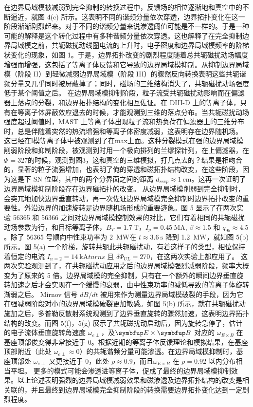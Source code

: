 在边界局域模被减弱到完全抑制的转换过程中，反馈场的相位逐渐地和真空中的不断逼近，就图 4(c) 所示。这表明不同的谐频分量依次穿透，边界拓扑变化在这一阶段渐渐剧烈起来。对于不同的谐频分量来说渗透阈值可能是不一样的。于是一种可能的解释是这个转化过程中有多种谐频分量依次穿透。这也解释了在完全抑制边界局域模之前，共轭磁扰动线圈电流的上升时，电子密度和边界局域模频率的阶梯状变化的现象，如图 1。于是，边界拓扑改变的剧烈程度随着总共轭磁扰动场幅度增强而增强，这包括了等离子体反馈和它导致的边界局域模抑制。从抑制边界局域模（阶段 II）到轻微减弱边界局域模（阶段 III）的骤然反向转换表明这些共轭谐频分量又几乎同时被屏蔽掉了；同时，磁场的三维结构消失了，共轭磁扰动场强度低于某个阈值之后。
在边界局域模抑制阶段，粒子流受共轭磁扰动影响而在偏滤器上落点的分裂，和边界拓扑结构的变化相互佐证。在 DIII-D 上的\Lmode 等离子体，只有在等离子体屏蔽效应退去的时候，才能观测到三维的落点分布。当共轭磁扰动场强度超过阈值时，MAST 上\Lmode 等离子体出现粒子流和热负荷在偏滤器上的三维分布时，总是伴随着突然的热流增强和等离子体密度减弱，这表明存在边界随机场。
这已经在l模等离子体中被观测到了在max上面。这种分裂模式在强的边界局域模削弱阶段和抑制阶段，被观测到时用一个极向排列的兰缪探针列，在上偏滤器，在 $\Phi =327$\degree 的时候，观测到图3，这和真空的三维模拟，打几点去的？结果是相吻合的，显著的粒子流强增加，也表明了俺的穿透和磁拓扑结构改变，在这些阶段，因为这是下 SN 位型，其中的两个分界面之间的距离 $d_{rsep}\approx \SI{1}{\centi\metre}$。这再一次证明了边界局域模抑制阶段存在边界磁拓扑的改变。
从边界局域模削弱到完全抑制时，会突兀地加快边界垂直转动，再一次佐证边界局域模完全抑制时边界拓扑改变的重要性。外沿边界的加速旋转是边界随机场形成的重要迹象。图 5 显示了在两次实验 56365 和 56366 之间对边界局域模控制效果的对比，它们有着相同的共轭磁扰动场参数为行，和目标等离子体，$B_T=\SI{1.7}{\tesla}$，$I_p=\SI{0.45}{\mega\ampere}$, $\beta\approx 1.5$ 和 $q_{95}\approx 4.5$。除了 56365 号顺向中性束功率为 \SI{2}{\mega\watt}在 $t\approx \SI{3.6}{\second}$ 降到 \SI{1.2}{\mega\watt}，就如图 5(b) 所示。图 5(a) 一个阶梯，旋转共轭此共轭磁扰动，有着这样子的类型，相位保持着恒定的电流 $I_{n=2}=\SI{14}{\kilo\ampere turns}$ 且 $\delta\Phi_{UL}=270$\degree，在这两次实验上都应用了。
这两次实验观测到了，在共轭磁扰动应用之后的边界局域模强烈减弱阶段，频率大概变为了原来的 5 倍。边界局域模的完全抑制，只有在一个额外的瞬间边界垂直旋转加速之后才会实现在一个缓慢的衰弱，由中性束功率的减低导致的等离子体旋转渐弱之后。 Mirnov 信号 $dB/dt$ 被用来作为测量边界局域模破裂的手段，因为它在强减弱阶段对小的边界局域模破裂更加敏感。如图 5(b) 所示，就在共轭磁扰动施加之后，多普勒反散射系统观测到了边界垂直旋转的骤然加速，这表明边界拓扑结构的改变。而图 5(f)，5(g) 展示了共轭磁扰动启动后，因为旋转急停了，估计的电子流体垂直旋转角速度 $\omega_{e\perp}$，及$\Vect{E}\times\Vect{B}$ 对应的 $\omega_{E\times B}$ 在基座顶部俊变得非常接近于 0。根据近期的等离子体反馈理论和模拟结果，在基座顶部附近（此处 $\omega_{e\perp}\approx 0$）的共轭谐频分量可能渗透。在边界局域模抑制时，基座顶部处 $\omega_{e\perp}$ 又更接近于 0，此处 $\rho \approx 0.9$，而且$\omega_{E\times B}$ 在 $\rho=0.92$ 以内分布相当平坦。
更多的模式可能会渗透进等离子体，促成了最终的边界局域模抑制效果。以上论述表明强烈的边界局域模减弱效果和磁渗透及边界拓扑结构的改变是相关联的，并且最终到边界局域模完全抑制阶段的转换需要边界拓扑变化达到一定剧烈程度。

